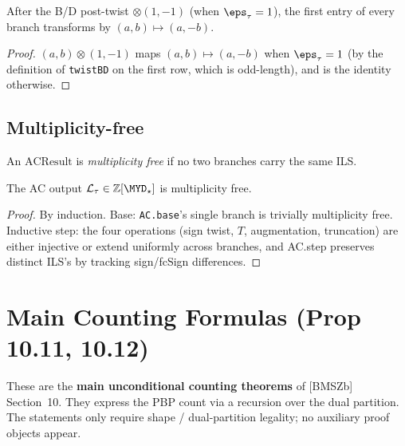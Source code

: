 \begin{theorem}
  \label{thm:postTwist_first_entry}
  \leanok
  After the B/D post-twist $\otimes(1, -1)$ (when $\eps_\tau = 1$), the first entry of every branch transforms by $(a, b) \mapsto (a, -b)$.
\end{theorem}
\begin{proof}
  \leanok
  $(a, b) \otimes (1, -1)$ maps $(a, b) \mapsto (a, -b)$ when $\eps_\tau = 1$ (by the definition of \texttt{twistBD} on the first row, which is odd-length), and is the identity otherwise.
\end{proof}


\section{Multiplicity-free}

\begin{definition}[MultiplicityFree]
  \label{def:mfree}
  \leanok
  An $\mathrm{ACResult}$ is \emph{multiplicity free} if no two branches carry the same ILS.
\end{definition}

\begin{proposition}
  \label{prop:11_7}
  \leanok
  The AC output $\mathcal{L}_\tau \in \mathbb{Z}[\MYD_\star]$ is multiplicity free.
\end{proposition}
\begin{proof}
  \leanok
  By induction. Base: \texttt{AC.base}'s single branch is trivially multiplicity free.
  Inductive step: the four operations (sign twist, $T$, augmentation, truncation) are either injective or extend uniformly across branches, and AC.step preserves distinct ILS's by tracking sign/fcSign differences.
\end{proof}


\chapter{Main Counting Formulas (Prop 10.11, 10.12)}
\label{chap:counting}

These are the \textbf{main unconditional counting theorems} of [BMSZb]
Section~10. They express the PBP count via a recursion over the dual
partition. The statements only require shape / dual-partition legality; no
auxiliary proof objects appear.

